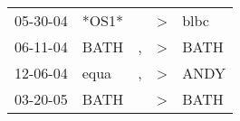 \begin{supertabular}{p{0.07\textwidth}p{0.06\textwidth}p{0.02\textwidth}p{0.02\textwidth}p{0.06\textwidth}}
 05-30-04\textsuperscript{} &                   *OS1* &    &  \textgreater &  blbc\textsuperscript{} \\
 06-11-04\textsuperscript{} &  BATH\textsuperscript{} &  , &  \textgreater &  BATH\textsuperscript{} \\
 12-06-04\textsuperscript{} &  equa\textsuperscript{} &  , &  \textgreater &  ANDY\textsuperscript{} \\
 03-20-05\textsuperscript{} &  BATH\textsuperscript{} &    &  \textgreater &  BATH\textsuperscript{} \\
\end{supertabular}
